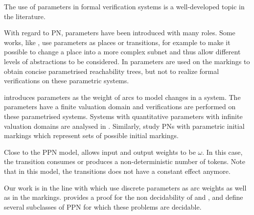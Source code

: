 The use of parameters in formal verification systems is a well-developed topic in the literature.

With regard to \ac{PN}, parameters have been introduced with many roles.
Some works, like \cite{Christensen97}, use parameters as places or transitions, for example to make it possible to change a place into a more complex subnet and thus allow different levels of abstractions to be considered.
In \cite{Lindqvist91} parameters are used on the markings to obtain concise parametrised reachability trees, but not to realize formal verifications on these parametric systems.

\cite{Badouel99} introduces parameters as the weight of arcs to model changes in a system.
The parameters have a finite valuation domain and verifications are performed on these parametrised systems.
Systems with quantitative parameters with infinite valuation domains are analysed in \cite{Abdulla13}.
Similarly, \cite{Marsan94} study \acp{PN} with parametric initial markings which represent sets of possible initial markings.

Close to the \ac{PPN} model, \opn \citep{Geeraerts15} allows input and output weights to be $\omega$. In this case, the transition consumes or produces a non-deterministic number of tokens. Note that in this model, the transitions does not have a constant effect anymore.

Our work is in the line with \cite{David17} which use discrete parameters as arc weights as well as in the markings.
\cite{David17} provides a proof for the non decidability of \Ucov and \Ecov, and define several subclasses of \ac{PPN} for which these problems are decidable.
